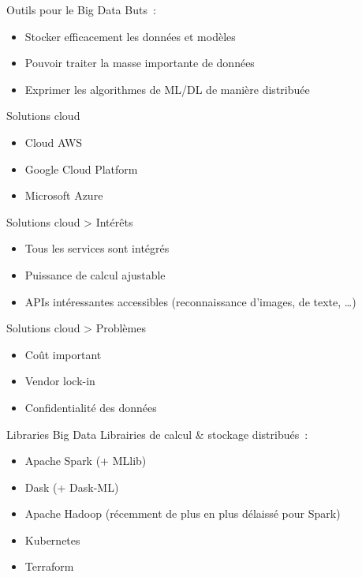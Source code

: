 \begin{frame}{Outils pour le Big Data}
  Buts~:
  \begin{itemize}[<+->]
    \item Stocker efficacement les données et modèles
    \item Pouvoir traiter la masse importante de données
    \item Exprimer les algorithmes de ML/DL de manière distribuée
  \end{itemize}
\end{frame}

\begin{frame}{Solutions cloud}
  \begin{itemize}[<+->]
    \item Cloud AWS
    \item Google Cloud Platform
    \item Microsoft Azure
  \end{itemize}
\end{frame}

\begin{frame}{Solutions cloud > Intérêts}
  \begin{itemize}[<+->]
    \item Tous les services sont intégrés
    \item Puissance de calcul ajustable
    \item APIs intéressantes accessibles (reconnaissance d'images, de texte, …)
  \end{itemize}
\end{frame}

\begin{frame}{Solutions cloud > Problèmes}
  \begin{itemize}[<+->]
    \item Coût important
    \item Vendor lock-in
    \item Confidentialité des données
  \end{itemize}
\end{frame}

\begin{frame}{Libraries Big Data}
  Librairies de calcul \& stockage distribués~:
  \begin{itemize}[<+->]
    \item Apache Spark (+ MLlib)
    \item Dask (+ Dask-ML)
    \item Apache Hadoop (récemment de plus en plus délaissé pour Spark)
  \end{itemize}  

  \begin{itemize}[<+->]
    \item Kubernetes
    \item Terraform
  \end{itemize}
\end{frame}